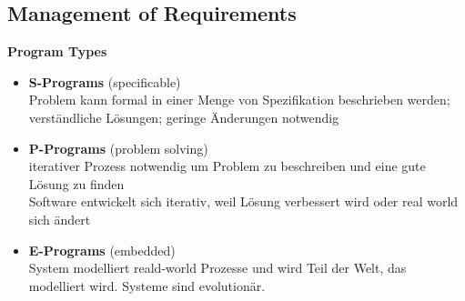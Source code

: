 \subsection{Management of Requirements}
\textbf{Program Types}
\begin{itemize}
	\item \textbf{S-Programs} (specificable)\\
	Problem kann formal in einer Menge von Spezifikation beschrieben werden; verständliche Lösungen; geringe Änderungen notwendig
	
	\item \textbf{P-Programs} (problem solving)\\
	iterativer Prozess notwendig um Problem zu beschreiben und eine gute Lösung zu finden\\
	Software entwickelt sich iterativ, weil Lösung verbessert wird oder real world sich ändert
	
	\item \textbf{E-Programs} (embedded) \\
	System modelliert reald-world Prozesse und wird Teil der Welt, das modelliert wird. Systeme sind evolutionär.
\end{itemize}

